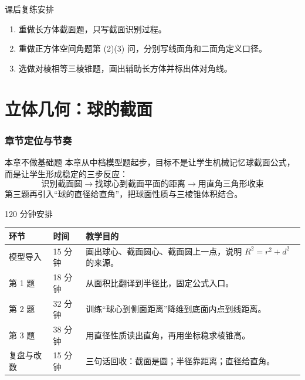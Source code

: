 \documentclass[11pt,a4paper]{ctexart}
\begin{document}
\begin{teachbox}{课后复练安排}
\begin{enumerate}[label=\arabic*. , leftmargin=2em, itemsep=0.25em]
  \item 重做长方体截面题，只写截面识别过程。
  \item 重做正方体空间角题第 (2)(3) 问，分别写线面角和二面角定义口径。
  \item 选做对棱相等三棱锥题，画出辅助长方体并标出体对角线。
\end{enumerate}
\end{teachbox}




\newpage
\part{立体几何：球的截面}

\section{章节定位与节奏}

\begin{teachbox}{本章不做基础题}
本章从中档模型题起步，目标不是让学生机械记忆球截面公式，而是让学生形成稳定的三步反应：
\[
  \boxed{
    \text{识别截面圆}
    \rightarrow
    \text{找球心到截面平面的距离}
    \rightarrow
    \text{用直角三角形收束}
  }
\]
第三题再引入“球的直径给直角”，把球面性质与三棱锥体积结合。
\end{teachbox}

\begin{teachbox}{120 分钟安排}
\renewcommand{\arraystretch}{1.35}
\begin{tabularx}{\textwidth}{p{3.2cm}p{2.2cm}X}
\toprule
环节 & 时间 & 教学目的 \\
\midrule
模型导入 & 15 分钟 & 画出球心、截面圆心、截面圆上一点，说明 $R^2=r^2+d^2$ 的来源。 \\
第 1 题 & 18 分钟 & 从面积比翻译到半径比，固定公式入口。 \\
第 2 题 & 32 分钟 & 训练“球心到侧面距离”降维到底面内点到线距离。 \\
第 3 题 & 38 分钟 & 用直径性质读出直角，再用坐标稳求棱锥高。 \\
复盘与改数 & 15 分钟 & 三句话回收：截面是圆；半径靠距离；直径给直角。 \\
\bottomrule
\end{tabularx}
\end{teachbox}
\end{document}
